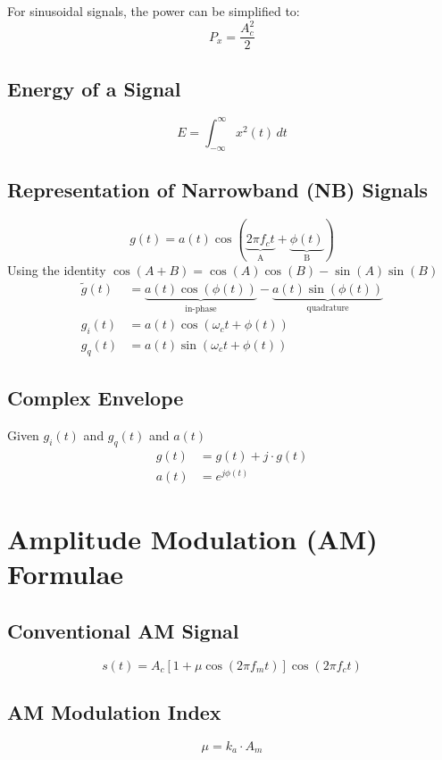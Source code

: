 \documentclass[10pt]{article}
\begin{document}
For sinusoidal signals, the power can be simplified to:
$$
	P_x = \frac{A_c^2}{2}
$$

\subsection{Energy of a Signal}
$$
	E = \int_{-\infty}^{\infty} x^2(t) \, dt
$$

\subsection{Representation of Narrowband (NB) Signals}
$$
	g(t) = a(t) \cos(\underbrace{2 \pi f_c t}_{\text{A}} + \underbrace{\phi(t)}_{\text{B}})
$$
Using the identity $\cos(A+B) = \cos(A)\cos(B) - \sin(A)\sin(B)$
\begin{align*}
	\tilde{g}(t) & = \underbrace{a(t) \cos(\phi(t))}_{\text{in-phase}} - \underbrace{a(t) \sin(\phi(t))}_{\text{quadrature}} \\
	g_i(t)       & = a(t) \cos(\omega_c t + \phi(t))                                                                         \\
	g_q(t)       & = a(t) \sin(\omega_c t + \phi(t))
\end{align*}

\subsection{Complex Envelope}
Given $g_i(t)$ and $g_q(t)$ and $a(t)$
\begin{align*}
	g(t) & = g(t) + j \cdot g(t) \\
	a(t) & = e^{j\phi(t)}
\end{align*}

\section{Amplitude Modulation (AM) Formulae}
\subsection{Conventional AM Signal}
\[
	s(t) = A_c\left[1 + \mu\cos(2 \pi f_m t)\right]\cos(2 \pi f_c t)
\]

\subsection{AM Modulation Index}

$$
	\mu = k_a \cdot A_m
$$
\end{document}
